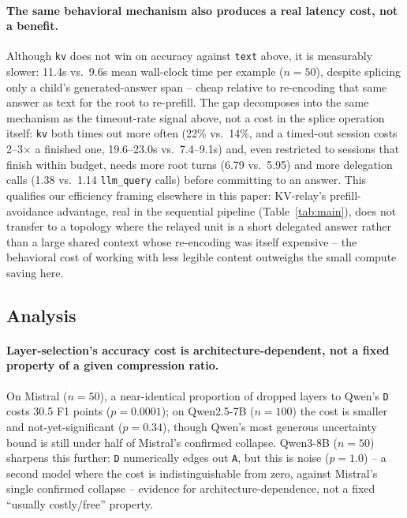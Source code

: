 \documentclass[11pt]{article}
\begin{document}
\paragraph{The same behavioral mechanism also produces a real latency
cost, not a benefit.} Although \texttt{kv} does not win on accuracy
against \texttt{text} above, it is measurably slower: 11.4s vs.\ 9.6s
mean wall-clock time per example ($n=50$), despite splicing only a
child's generated-answer span -- cheap relative to re-encoding that same
answer as text for the root to re-prefill. The gap decomposes into the
same mechanism as the timeout-rate signal above, not a cost in the splice
operation itself: \texttt{kv} both times out more often (22\% vs.\ 14\%,
and a timed-out session costs 2--3$\times$ a finished one, 19.6--23.0s
vs.\ 7.4--9.1s) and, even restricted to sessions that finish within
budget, needs more root turns (6.79 vs.\ 5.95) and more delegation calls
(1.38 vs.\ 1.14 \texttt{llm\_query} calls) before committing to an
answer. This qualifies our efficiency framing elsewhere in this paper:
KV-relay's prefill-avoidance advantage, real in the sequential pipeline
(Table~\ref{tab:main}), does not transfer to a topology where the
relayed unit is a short delegated answer rather than a large shared
context whose re-encoding was itself expensive -- the behavioral cost of
working with less legible content outweighs the small compute saving
here.

\subsection{Analysis}
\label{sec:analysis}

\paragraph{Layer-selection's accuracy cost is architecture-dependent, not
a fixed property of a given compression ratio.} On Mistral ($n=50$), a
near-identical proportion of dropped layers to Qwen's \texttt{D} costs
30.5 F1 points ($p=0.0001$); on Qwen2.5-7B ($n=100$) the cost is smaller
and not-yet-significant ($p=0.34$), though Qwen's most generous
uncertainty bound is still under half of Mistral's confirmed collapse.
Qwen3-8B ($n=50$) sharpens this further: \texttt{D} numerically edges out
\texttt{A}, but this is noise ($p=1.0$) -- a second model where the cost
is indistinguishable from zero, against Mistral's single confirmed
collapse -- evidence for architecture-dependence, not a fixed
``usually costly/free'' property.
\end{document}
